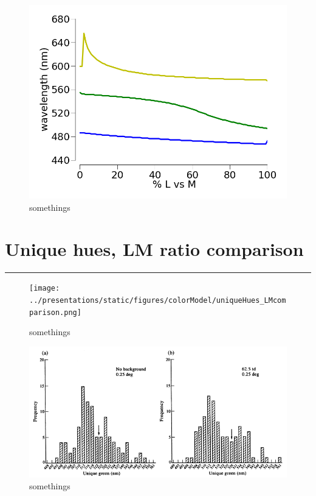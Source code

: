 \begin{figure}[htbp]
\centering
\includegraphics{../presentations/static/figures/colorModel/uniqueHues.png}
\caption{somethings}
\end{figure}

\section{Unique hues, LM ratio comparison}

\begin{center}\rule{3in}{0.4pt}\end{center}

\begin{figure}[htbp]
\centering
\texttt{[image: ../presentations/static/figures/colorModel/uniqueHues\_LMcomparison.png]}
\caption{somethings}
\end{figure}

\begin{figure}[htbp]
\centering
\includegraphics{../presentations/static/figures/colorModel/Volbrecht1997.gif}
\caption{somethings}
\end{figure}
